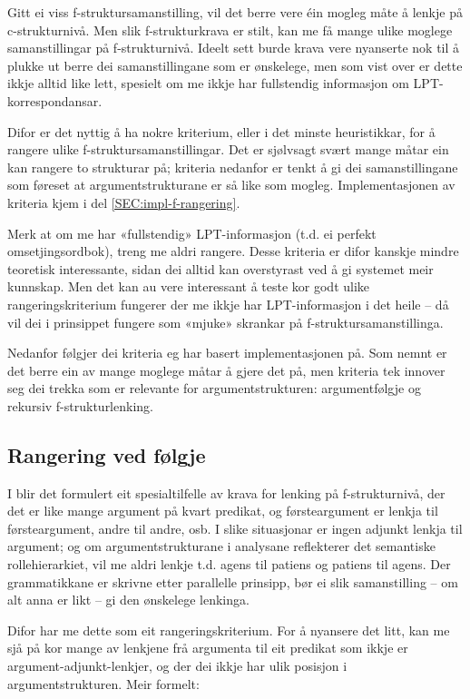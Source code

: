 \documentclass[12pt,a4paper,oneside,draft]{report}
\begin{document}
Gitt ei viss f\hyp{}struktursamanstilling, vil det berre vere éin mogleg
måte å lenkje på c\hyp{}strukturnivå. Men slik f\hyp{}strukturkrava er stilt,
kan me få mange ulike moglege samanstillingar på
f\hyp{}strukturnivå. Ideelt sett burde krava vere nyanserte nok til å
plukke ut berre dei samanstillingane som er ønskelege, men som vist
over er dette ikkje alltid like lett, spesielt om me ikkje har
fullstendig informasjon om LPT\hyp{}korrespondansar.

Difor er det nyttig å ha nokre kriterium, eller i det minste
heuristikkar, for å rangere ulike f\hyp{}struktursamanstillingar. Det er
sjølvsagt svært mange måtar ein kan rangere to strukturar på; kriteria
nedanfor er tenkt å gi dei samanstillingane som føreset at
argumentstrukturane er så like som mogleg. Implementasjonen av
kriteria kjem i del \ref{SEC:impl-f-rangering}.

Merk at om me har «fullstendig» LPT\hyp{}informasjon (t.d. ei perfekt
omsetjingsordbok), treng me aldri rangere. Desse kriteria er difor
kanskje mindre teoretisk interessante, sidan dei alltid kan
overstyrast ved å gi systemet meir kunnskap. Men det kan au vere
interessant å teste kor godt ulike rangeringskriterium fungerer der me
ikkje har LPT\hyp{}informasjon i det heile -- då vil dei i prinsippet
fungere som «mjuke» skrankar på f\hyp{}struktursamanstillinga.

Nedanfor følgjer dei kriteria eg har basert implementasjonen på. Som
nemnt er det berre ein av mange moglege måtar å gjere det på, men
kriteria tek innover seg dei trekka som er relevante for
argumentstrukturen: argumentfølgje og rekursiv f\hyp{}strukturlenking.

\subsection{Rangering ved følgje}
\label{sec-3.8.1}

I \citet[s.~75--76]{dyvik2009lmp} blir det formulert eit
spesialtilfelle av krava for lenking på f\hyp{}strukturnivå, der det er
like mange argument på kvart predikat, og førsteargument er lenkja til
førsteargument, andre til andre, osb. I slike situasjonar er ingen
adjunkt lenkja til argument; og om argumentstrukturane i analysane
reflekterer det semantiske rollehierarkiet, vil me aldri lenkje
t.d. agens til patiens og patiens til agens. Der grammatikkane er
skrivne etter parallelle prinsipp, bør ei slik samanstilling -- om alt
anna er likt -- gi den ønskelege lenkinga.

Difor har me dette som eit rangeringskriterium. For å nyansere det
litt, kan me sjå på kor mange av lenkjene frå argumenta til eit
predikat som ikkje er argument-adjunkt-lenkjer, og der dei ikkje har
ulik posisjon i argumentstrukturen. Meir formelt:
\end{document}

